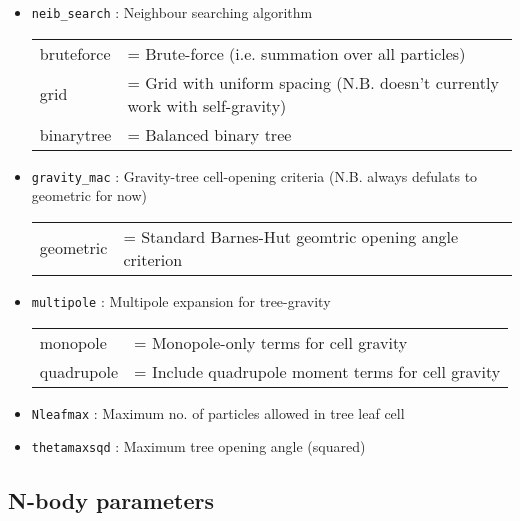 \documentclass[a4paper]{article}
\newcommand{\var}[1]{\texttt{#1}}
\begin{document}
\begin{itemize}

\item \var{neib\_search} : Neighbour searching algorithm \vspace{0.1cm} \\
\begin{tabular}{ll}
bruteforce & = Brute-force (i.e. summation over all particles) \\
grid       & = Grid with uniform spacing (N.B. doesn't currently work with self-gravity) \\
binarytree & = Balanced binary tree
\end{tabular}

\item \var{gravity\_mac} : Gravity-tree cell-opening criteria (N.B. always defulats to geometric for now) \vspace{0.1cm} \\
\begin{tabular} {ll}
geometric & = Standard Barnes-Hut geomtric opening angle criterion
\end{tabular}

\item \var{multipole} : Multipole expansion for tree-gravity \vspace{0.1cm} \\
\begin{tabular} {ll}
monopole & = Monopole-only terms for cell gravity \\
quadrupole & = Include quadrupole moment terms for cell gravity
\end{tabular}

\item \var{Nleafmax} : Maximum no. of particles allowed in tree leaf cell

\item \var{thetamaxsqd} : Maximum tree opening angle (squared)

\end{itemize}





\subsection{N-body parameters}
\end{document}
